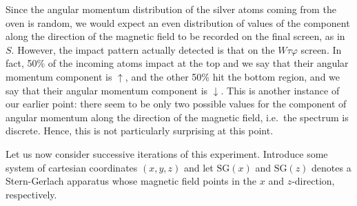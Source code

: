 \begin{center}
\end{center}

Since the angular momentum distribution of the silver atoms coming from the oven is random, we would expect an even distribution of values of the component along the direction of the magnetic field to be recorded on the final screen, as in $S$. However, the impact pattern actually detected is that on the $W\tau\varphi$ screen. In fact, 50\% of the incoming atoms impact at the top and we say that their angular momentum component is $\uparrow$, and the other 50\% hit the bottom region, and we say that their angular momentum component is $\downarrow$.  This is another instance of our earlier point: there seem to be only two possible values for the component of angular momentum along the direction of the magnetic field, i.e.\ the spectrum is discrete. Hence, this is not particularly surprising at this point.

Let us now consider successive iterations of this experiment. Introduce some system of cartesian coordinates $(x,y,z)$ and let $\mathrm{SG}(x)$ and $\mathrm{SG}(z)$ denotes a Stern-Gerlach apparatus whose magnetic field points in the $x$ and $z$-direction, respectively.

